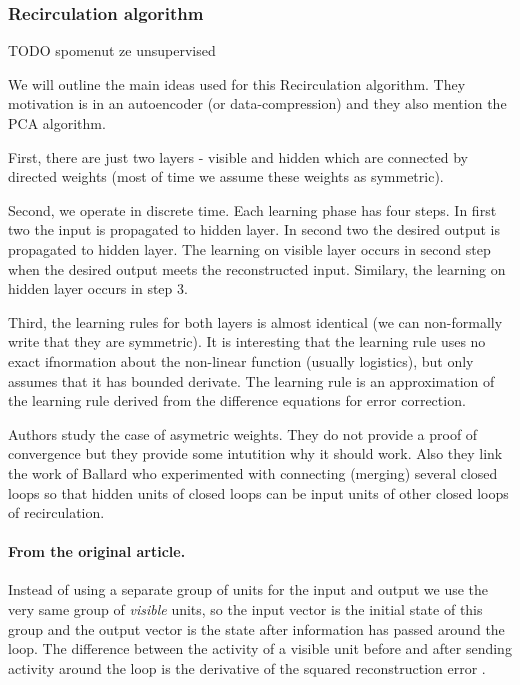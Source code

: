 \subsubsection{Recirculation algorithm}
\label{models-recirc} 

TODO spomenut ze unsupervised 

We will outline the main ideas used for this Recirculation algorithm. They motivation is in an autoencoder (or data-compression) and they also mention the PCA algorithm. 

First, there are just two layers - visible and hidden which are connected by directed weights (most of time we assume these weights as symmetric). 

Second, we operate in discrete time. Each learning phase has four steps. In first two the input is propagated to hidden layer. In second two the desired output is propagated to hidden layer. The learning on visible layer occurs in second step when the desired output meets the reconstructed input. Similary, the learning on hidden layer occurs in step 3.

Third, the learning rules for both layers is almost identical (we can non-formally write that they are symmetric). It is interesting that the learning rule uses no exact ifnormation about the non-linear function (usually logistics), but only assumes that it has bounded derivate. The learning rule is an approximation of the learning rule derived from the difference equations for error correction. 

Authors study the case of asymetric weights. They do not provide a proof of convergence but they provide some intutition why it should work. Also they link the work of Ballard who experimented with connecting (merging) several closed loops so that hidden units of closed loops can be input units of other closed loops of recirculation.

\paragraph{From the original article.}
Instead of using a separate group of units for the input and output we use the very same group of \textit{visible} units, so the input vector is the initial state of this group and the output vector is the state after information has passed around the loop. The difference between the activity of a visible unit before and after sending activity around the loop is the derivative of the squared reconstruction error \citet{hinton1988learning}.

